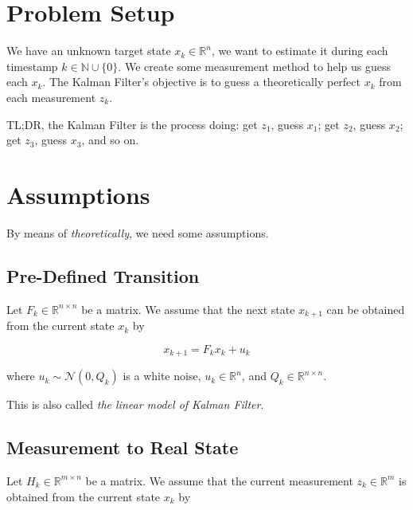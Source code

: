 \documentclass{article}
\begin{document}
    \section*{Problem Setup}

        We have an unknown target state $ x_{k} \in \mathbb{R}^{n} $, we want
        to estimate it during each timestamp $ k \in \mathbb{N} \cup \{0\} $.
        We create some measurement method to help us guess each $ x_{k} $. The
        Kalman Filter's objective is to guess a theoretically perfect $ x_{k} $
        from each measurement $ z_{k} $.

        TL;DR, the Kalman Filter is the process doing: get $ z_{1} $, guess $
        x_{1} $; get $ z_{2} $, guess $ x_{2} $; get $ z_{3} $, guess $ x_{3}
        $, and so on.

    \section{Assumptions}

        By means of \textit{theoretically}, we need some assumptions.

        \subsection{Pre-Defined Transition}

            Let $ F_{k} \in \mathbb{R}^{n \times n} $ be a matrix. We assume
            that the next state $ x_{k+1} $ can be obtained from the current
            state $ x_{k} $ by

            \begin{equation}
                 x_{k+1} = F_{k}x_{k} + u_{k}
            \end{equation}

            where $ u_{k} \sim \mathcal{N}(0, Q_{k}) $  is a white noise, $
            u_{k} \in \mathbb{R}^{n} $, and $ Q_{k} \in \mathbb{R}^{n \times n}
            $.

            This is also called \textit{the linear model of Kalman Filter}.

        \subsection{Measurement to Real State}

            Let $ H_{k} \in \mathbb{R}^{m \times n} $ be a matrix. We assume
            that the current measurement $ z_{k} \in \mathbb{R}^{m} $ is
            obtained from the current state $ x_{k} $ by
\end{document}
